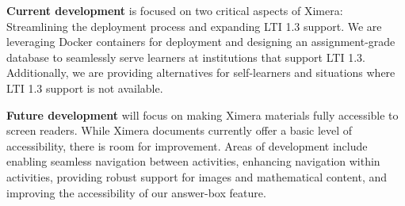 \documentclass[twocolumn]{article}
\begin{document}
\begin{xframe}
    {\sffamily\bfseries Current development} is focused on two critical aspects
    of Ximera: Streamlining the deployment process and expanding LTI 1.3
    support.
    We are leveraging Docker containers for deployment and designing an
    assignment-grade database to seamlessly serve learners at institutions that
    support LTI 1.3. Additionally, we are providing alternatives for
    self-learners
    and situations where LTI 1.3 support is not available.
    \begin{center}
    \end{center}
\end{xframe}
\begin{xframe}
    {\sffamily\bfseries Future development} will focus on making Ximera
    materials fully accessible to screen readers. While Ximera documents
    currently
    offer a basic level of accessibility, there is room for
    improvement. Areas of development include enabling seamless navigation
    between activities, enhancing navigation within activities, providing
    robust
    support for images and mathematical content, and improving the
    accessibility of
    our answer-box feature.
\end{xframe}
\end{document}
